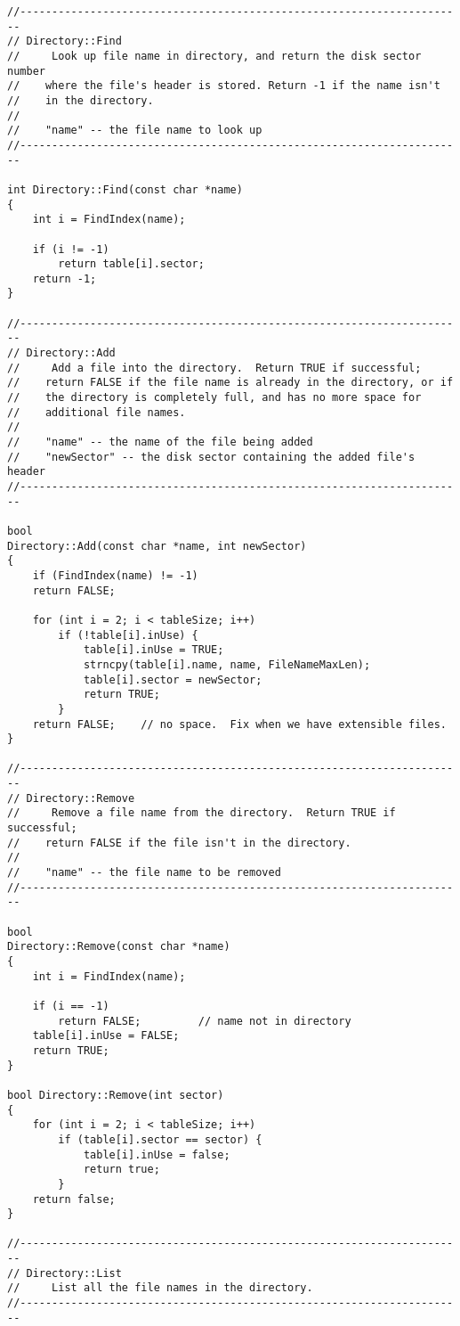 \documentclass[a4paper,10pt]{article}
\begin{document}
\begin{lstlisting}
//----------------------------------------------------------------------
// Directory::Find
//     Look up file name in directory, and return the disk sector number
//    where the file's header is stored. Return -1 if the name isn't
//    in the directory.
//
//    "name" -- the file name to look up
//----------------------------------------------------------------------

int Directory::Find(const char *name)
{
    int i = FindIndex(name);

    if (i != -1)
        return table[i].sector;
    return -1;
}

//----------------------------------------------------------------------
// Directory::Add
//     Add a file into the directory.  Return TRUE if successful;
//    return FALSE if the file name is already in the directory, or if
//    the directory is completely full, and has no more space for
//    additional file names.
//
//    "name" -- the name of the file being added
//    "newSector" -- the disk sector containing the added file's header
//----------------------------------------------------------------------

bool
Directory::Add(const char *name, int newSector)
{
    if (FindIndex(name) != -1)
    return FALSE;

    for (int i = 2; i < tableSize; i++)
        if (!table[i].inUse) {
            table[i].inUse = TRUE;
            strncpy(table[i].name, name, FileNameMaxLen);
            table[i].sector = newSector;
            return TRUE;
        }
    return FALSE;    // no space.  Fix when we have extensible files.
}

//----------------------------------------------------------------------
// Directory::Remove
//     Remove a file name from the directory.  Return TRUE if successful;
//    return FALSE if the file isn't in the directory.
//
//    "name" -- the file name to be removed
//----------------------------------------------------------------------

bool
Directory::Remove(const char *name)
{
    int i = FindIndex(name);

    if (i == -1)
        return FALSE;         // name not in directory
    table[i].inUse = FALSE;
    return TRUE;
}

bool Directory::Remove(int sector)
{
    for (int i = 2; i < tableSize; i++)
        if (table[i].sector == sector) {
            table[i].inUse = false;
            return true;
        }
    return false;
}

//----------------------------------------------------------------------
// Directory::List
//     List all the file names in the directory.
//----------------------------------------------------------------------


\end{lstlisting}
\end{document}

